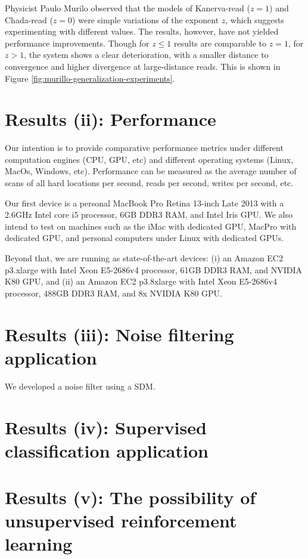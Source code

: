 Physicist Paulo Murilo observed that the models of Kanerva-read ($z=1$) and Chada-read ($z=0$) were simple variations of the exponent $z$, which suggests experimenting with different values. The results, however, have not yielded performance improvements.  Though for $z \leq 1$ results are comparable to $z=1$, for $z>1$, the system shows a clear deterioration, with a smaller distance to convergence and higher divergence at large-distance reads. This is shown in Figure \ref{fig:murillo-generalization-experiments}.



\section{Results (ii): Performance}

Our intention is to provide comparative performance metrics under different computation engines (CPU, GPU, etc) and different operating systems (Linux, MacOs, Windows, etc). Performance can be measured as the average number of scans of all hard locations per second, reads per second, writes per second, etc.

Our first device is a personal MacBook Pro Retina 13-inch Late 2013 with a 2.6GHz Intel core i5 processor, 6GB DDR3 RAM, and Intel Iris GPU.  We also intend to test on machines such as the iMac with dedicated GPU, MacPro with dedicated GPU, and personal computers under Linux with dedicated GPUs.

Beyond that, we are running as state-of-the-art devices: (i) an Amazon EC2 p3.xlarge with Intel Xeon E5-2686v4 processor, 61GB DDR3 RAM, and NVIDIA K80 GPU, and (ii) an Amazon EC2 p3.8xlarge with Intel Xeon E5-2686v4 processor, 488GB DDR3 RAM, and 8x NVIDIA K80 GPU.



\section{Results (iii): Noise filtering application}

We developed a noise filter using a SDM.


\section{Results (iv): Supervised classification application}



\section{Results (v): The possibility of unsupervised reinforcement learning}


